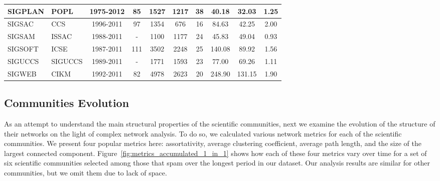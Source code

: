 \begin{table}[!htb]
{\begin{tabular}{|l|l|c|c|c|c|c|c|c|c|}
SIGPLAN & POPL & 1975-2012 & 85 & 1527 & 1217 & 38 & 40.18 & 32.03 & 1.25\\ \hline
SIGSAC & CCS & 1996-2011 & 97 & 1354 & 676 & 16 & 84.63 & 42.25 & 2.00\\ \hline
SIGSAM & ISSAC & 1988-2011 & - & 1100 & 1177 & 24 & 45.83 & 49.04 & 0.93\\ \hline
SIGSOFT & ICSE & 1987-2011 & 111 & 3502 & 2248 & 25 & 140.08 & 89.92 & 1.56\\ \hline
SIGUCCS & SIGUCCS & 1989-2011 & - & 1771 & 1593 & 23 & 77.00 & 69.26 & 1.11\\ \hline
SIGWEB & CIKM & 1992-2011 & 82 & 4978 & 2623 & 20 & 248.90 & 131.15 & 1.90\\ \hline
\end{tabular}
}
\end{table}



\subsection{Communities Evolution}

As an attempt to understand the main structural properties of the scientific communities, next we examine the evolution of the structure of their networks on the light of complex network analysis. To do so, we calculated various network metrics for each of the scientific communities. We present four popular metrics here: assortativity, average clustering coefficient, average path length, and the size of the largest connected component. Figure~\ref{fig:metrics_accumulated_1_in_1} shows how each of these four metrics vary over time for a set of six scientific communities selected among those that spam over the longest period in our dataset. Our analysis results are similar for other communities, but we omit them due to lack of space.

